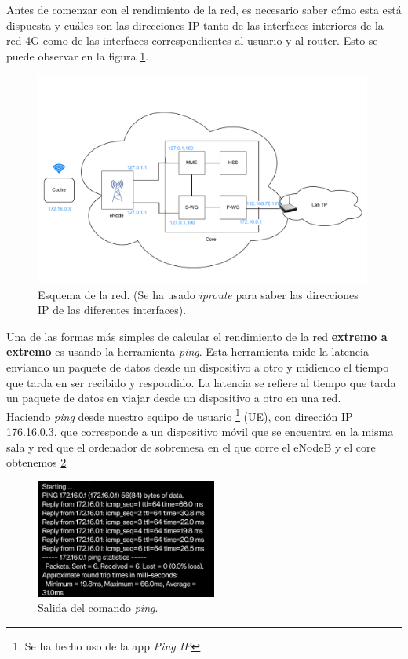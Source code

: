 Antes de comenzar con el rendimiento de la red, es necesario saber cómo esta está dispuesta  y cuáles son las direcciones IP tanto de las interfaces interiores de la red 4G como de las interfaces correspondientes al usuario y al router. Esto se puede observar en la figura \ref{fig:EsquemaRed}.

\begin{figure}[H]
    \centering
    \includegraphics[width=0.99\textwidth]{Imagenes/Solucion/10.pdf}
    \caption{Esquema de la red. (Se ha usado \textit{iproute} para saber las direcciones IP de las diferentes interfaces).}
    \label{fig:EsquemaRed}
\end{figure}

Una de las formas más simples de calcular el rendimiento de la red \textbf{extremo a extremo} es usando la herramienta \textit{ping}. Esta herramienta mide la latencia enviando un paquete de datos desde un dispositivo a otro y midiendo el tiempo que tarda en ser recibido y respondido. La latencia se refiere al tiempo que tarda un paquete de datos en viajar desde un dispositivo a otro en una red.\\

Haciendo \textit{ping} desde nuestro equipo de usuario \footnote{Se ha hecho uso de la app \textit{Ping IP}} (UE), con dirección IP 176.16.0.3, que corresponde a un dispositivo móvil  que se encuentra en la misma sala y red que el ordenador de sobremesa en el que corre el eNodeB y el core obtenemos \ref{fig:ping} 

 \begin{figure}[H]
    \centering
    \includegraphics[width=0.53\textwidth]{Imagenes/Rendimiento/ping.jpeg}
    \caption{Salida del comando \textit{ping}.}
    \label{fig:ping}
\end{figure}

